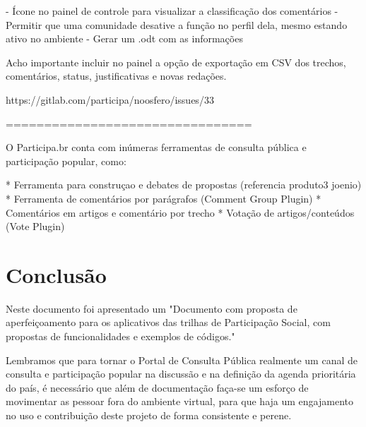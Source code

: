 \documentclass[12pt]{article}
\newcommand{\ProductDescription}{"Documento com proposta de aperfeiçoamento
  para os aplicativos das trilhas de Participação Social, com propostas de
  funcionalidades e exemplos de códigos."
}
\begin{document}
 - Ícone no painel de controle para visualizar a classificação dos comentários
 - Permitir que uma comunidade desative a função no perfil dela, mesmo estando ativo no ambiente
 - Gerar um .odt com as informações

Acho importante incluir no painel a opção de exportação em CSV dos trechos, comentários, status, justificativas e novas redações.
 
https://gitlab.com/participa/noosfero/issues/33

================================

O Participa.br conta com inúmeras ferramentas de consulta pública e
participação popular, como:

* Ferramenta para construçao e debates de propostas (referencia produto3 joenio)
* Ferramenta de comentários por parágrafos (Comment Group Plugin)
* Comentários em artigos e comentário por trecho
* Votação de artigos/conteúdos (Vote Plugin)


\section{Conclusão}

Neste documento foi apresentado um \ProductDescription

Lembramos que para tornar o Portal de Consulta Pública realmente um canal de
consulta e participação popular na discussão e na definição da agenda
prioritária do país, é necessário que além de documentação faça-se um esforço
de movimentar as pessoar fora do ambiente virtual, para que haja um
engajamento no uso e contribuição deste projeto de forma consistente e perene.

\newpage

\newpage
\listoffigures
\newpage
\printindex
\newpage

%
\end{document}
